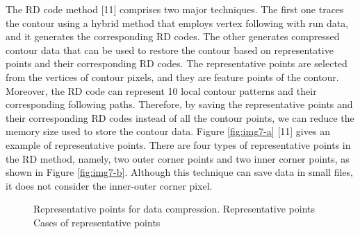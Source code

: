 The RD code method [11] comprises two major techniques. The first one traces the contour using a hybrid method that employs vertex following with run data, and it generates the corresponding RD codes. The other generates compressed contour data that can be used to restore the contour based on representative points and their corresponding RD codes. The representative points are selected from the vertices of contour pixels, and they are feature points of the contour. Moreover, the RD code can represent 10 local contour patterns and their corresponding following paths. Therefore, by saving the representative points and their corresponding RD codes instead of all the contour points, we can reduce the memory size used to store the contour data. Figure \ref{fig:img7-a} [11] gives an example of representative points. There are four types of representative points in the RD method, namely, two outer corner points and two inner corner points, as shown in Figure \ref{fig:img7-b}. Although this technique can save data in small files, it does not consider the inner-outer corner pixel. 

\begin{figure}[htbp]
	\centering
	\caption{Representative points for data compression. \protect{} Representative points \cite{Miyatake1997Contour} \protect{} Cases of representative points}
	\label{fig:rdcode}
\end{figure}